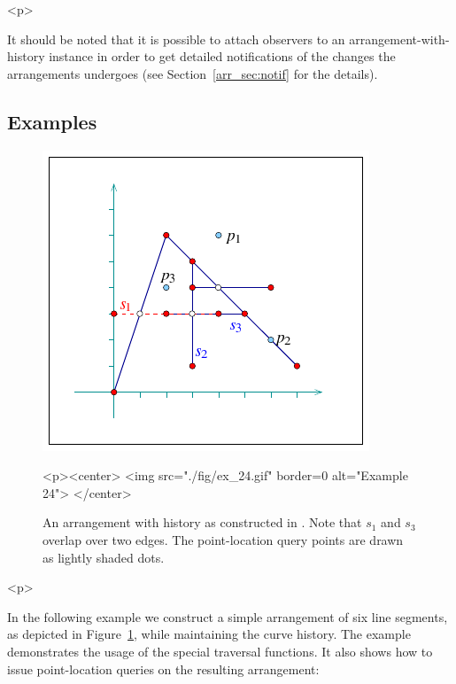 \begin{ccHtmlOnly}<p>\end{ccHtmlOnly}
It should be noted that it is possible to attach observers to an 
arrangement-with-history instance in order to get detailed notifications of
the changes the arrangements undergoes (see Section~\ref{arr_sec:notif} for
the details).

\subsection{Examples}
\label{arr_ssec:arr_hist_ex}
%
\begin{figure}[!htp]
\begin{ccTexOnly}
  \begin{center}
  \includegraphics{Arrangement_2/fig/ex_24}
  \end{center}
\end{ccTexOnly}
\begin{ccHtmlOnly}
  <p><center>
  <img src="./fig/ex_24.gif" border=0 alt="Example 24">
  </center>
\end{ccHtmlOnly}
\caption{An arrangement with history as constructed in . 
Note that $s_1$ and $s_3$ overlap over two edges. The point-location query
points are drawn as lightly shaded dots.}
\label{arr_fig:ex_24}
\end{figure}

\begin{ccHtmlOnly}<p>\end{ccHtmlOnly}
In the following example we construct a simple arrangement of six line
segments, as depicted in Figure~\ref{arr_fig:ex_24}, while maintaining 
the curve history. The example demonstrates the usage of the special
traversal functions. It also shows how to issue point-location queries
on the resulting arrangement:

